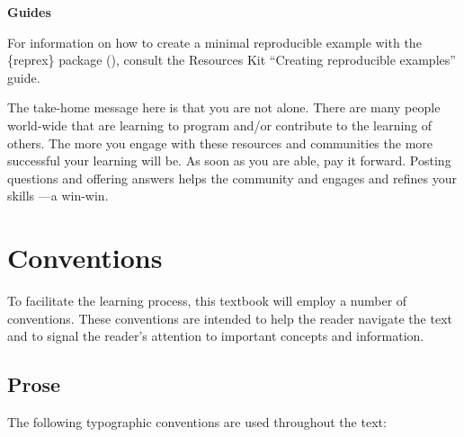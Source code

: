 \documentclass[
  letterpaper,
  krantz1]{latex/krantz-mod}
\theoremstyle{definition}
\theoremstyle{definition}
\theoremstyle{remark}
\begin{document}

\begin{tcolorbox}[enhanced jigsaw, toprule=.15mm, breakable, colback=white, arc=.35mm, left=2mm, colframe=quarto-callout-color-frame, opacityback=0, bottomrule=.15mm, rightrule=.15mm, leftrule=.75mm]

\textbf{ Guides}

For information on how to create a minimal reproducible example with the
\{reprex\} package (), consult the Resources Kit ``Creating
reproducible examples'' guide.

\end{tcolorbox}


The take-home message here is that you are not alone. There are many
people world-wide that are learning to program and/or contribute to the
learning of others. The more you engage with these resources and
communities the more successful your learning will be. As soon as you
are able, pay it forward. Posting questions and offering answers helps
the community and engages and refines your skills ---a win-win.

\section*{Conventions}\label{sec-preface-conventions}


To facilitate the learning process, this textbook will employ a number
of conventions. These conventions are intended to help the reader
navigate the text and to signal the reader's attention to important
concepts and information.

\subsection*{Prose}\label{sec-preface-prose}

The following typographic conventions are used throughout the text:
\end{document}
